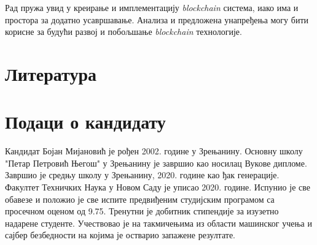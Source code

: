 \documentclass[12pt, a4paper]{article}
\begin{document}
Рад пружа увид у креирање и имплементацију \textit{blockchain} система, иако има и простора за додатно усавршавање. Анализа и предложена унапређења могу бити корисне за будући развој и побољшање \textit{blockchain} технологије.


\pagebreak
\section{Литература}
\renewcommand{\refname}{}
\vspace{-\parskip} %
\vspace{-\parskip} %
\vspace{-\parskip} %
\vspace{-\parskip} %
\setlength{\bibsep}{8pt}



\pagebreak
\section{Подаци о кандидату}
Кандидат Бојан Мијановић је рођен 2002. године у Зрењанину. Основну школу "Петар Петровић Његош" у Зрењанину је завршио као носилац Вукове дипломе. Завршио је средњу школу у Зрењанину, 2020. године као ђак генерације. Факултет Техничких Наука у Новом Саду је уписао 2020. године. Испунио је све обавезе и положио је све испите предвиђеним студијским програмом са просечном оценом од 9.75. Тренутни је добитник стипендије за изузетно надарене студенте. Учествовао је на такмичењима из области машинског учења и сајбер безбедности на којима је остварио запажене резултате.
\end{document}
